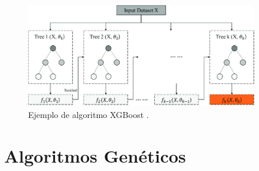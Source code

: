 \documentclass{uathesis-es}
\begin{document}
\begin{figure}[H]
    \centering
    \includegraphics[width=10cm]{Figures/Background/XGBoost-model-process.png}
    \caption{Ejemplo de algoritmo XGBoost \cite{XGBOOST_IMAGE}.}
    \label{GA_inicializacion}
\end{figure}









\section{Algoritmos Genéticos}

\end{document}
